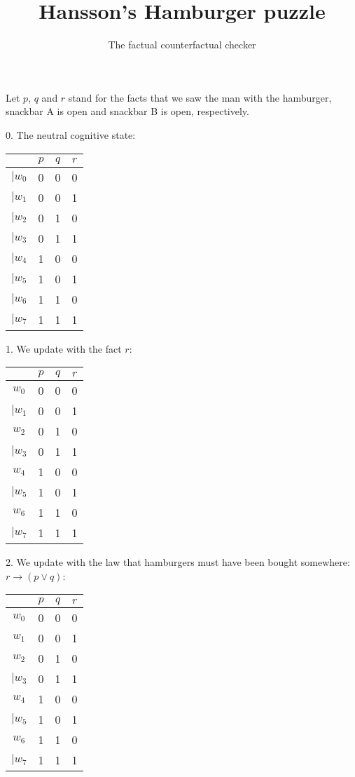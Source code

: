 \documentclass[a4paper,12pt,parskip=half]{scrartcl}
\title{Hansson's Hamburger puzzle}
\author{The factual counterfactual checker}
\begin{document}
    \maketitle
Let $p$, $q$ and $r$ stand for the facts that we saw the man with the hamburger, snackbar A is open and snackbar B is open, respectively.

0. The neutral cognitive state:\\\begin{tabular}{|c|ccc|}
    \hline 
           & $p$ & $q$ & $r$ \\ 
    \hline 
       $|w_0$  &  0  &  0  &  0  \\ 
       $|w_1$  &  0  &  0  &  1  \\ 
       $|w_2$  &  0  &  1  &  0  \\ 
       $|w_3$  &  0  &  1  &  1  \\ 
       $|w_4$  &  1  &  0  &  0  \\ 
       $|w_5$  &  1  &  0  &  1  \\ 
       $|w_6$  &  1  &  1  &  0  \\ 
       $|w_7$  &  1  &  1  &  1  \\ 
    \hline
    \end{tabular}

1. We update with the fact $ r $:\\\begin{tabular}{|c|ccc|}
    \hline 
           & $p$ & $q$ & $r$ \\ 
    \hline 
       $w_0$  &  0  &  0  &  0  \\ 
       $|w_1$  &  0  &  0  &  1  \\ 
       $w_2$  &  0  &  1  &  0  \\ 
       $|w_3$  &  0  &  1  &  1  \\ 
       $w_4$  &  1  &  0  &  0  \\ 
       $|w_5$  &  1  &  0  &  1  \\ 
       $w_6$  &  1  &  1  &  0  \\ 
       $|w_7$  &  1  &  1  &  1  \\ 
    \hline
    \end{tabular}

2. We update with the law that hamburgers must have been bought somewhere:$ r \to ( p \lor q ) $:\\\begin{tabular}{|c|ccc|}
    \hline 
           & $p$ & $q$ & $r$ \\ 
    \hline 
       $w_0$  &  0  &  0  &  0  \\ 
       \sout{$w_1$}  &  0  &  0  &  1  \\ 
       $w_2$  &  0  &  1  &  0  \\ 
       $|w_3$  &  0  &  1  &  1  \\ 
       $w_4$  &  1  &  0  &  0  \\ 
       $|w_5$  &  1  &  0  &  1  \\ 
       $w_6$  &  1  &  1  &  0  \\ 
       $|w_7$  &  1  &  1  &  1  \\ 
    \hline
    \end{tabular}
\end{document}
